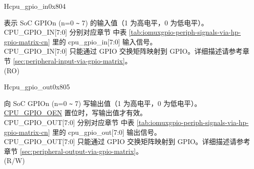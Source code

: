 \begin{register}{H}{cpu\_gpio\_in}{0x804}\label{regdesc:GPIO_IN}
%
%
%
%
%
%
%
%
%
\regnewline%
\begin{regdesc}\begin{reglist}
\label{fielddesc:GPIO_IN}\item [CPU\_GPIO\_IN] 表示 SoC GPIOn (n=0 \verb+~+ 7) 的输入值（1 为高电平，0 为低电平）。\\
CPU\_GPIO\_IN[7:0] 分别对应章节 \textit{} 中表 \ref{tab:iomuxgpio-periph-signals-via-hp-gpio-matrix-cn} 里的 cpu\_gpio\_in[7:0] 输入信号。\\
CPU\_GPIO\_IN[7:0] 只能通过 GPIO 交换矩阵映射到 GPIO。详细描述请参考章节 \ref{sec:peripheral-input-via-gpio-matrix}。
\\
(RO)
\end{reglist}\end{regdesc}
\end{register}
\begin{register}{H}{cpu\_gpio\_out}{0x805}\label{regdesc:GPIO_OUT}
%
%
%
%
%
%
%
%
%
\regnewline%
\begin{regdesc}\begin{reglist}
\label{fielddesc:GPIO_OUT}\item [CPU\_GPIO\_OUT] 向 SoC GPIOn (n=0 \verb+~+ 7) 写输出值（1 为高电平，0 为低电平）。\hyperref[fielddesc:GPIO_OEN]{CPU\_GPIO\_OEN} 置位时，写输出值才有效。\\
CPU\_GPIO\_OUT[7:0] 分别对应章节 \textit{} 中表 \ref{tab:iomuxgpio-periph-signals-via-hp-gpio-matrix-cn} 里的 cpu\_gpio\_out[7:0] 输出信号。\\
CPU\_GPIO\_OUT[7:0] 只能通过 GPIO 交换矩阵映射到 GPIO。详细描述请参考章节 \ref{sec:peripheral-output-via-gpio-matrix}。
\\
(R/W)
\end{reglist}\end{regdesc}
\end{register}
